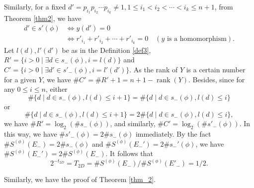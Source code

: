 \documentclass{amsart}
\numberwithin{equation}{section}
\theoremstyle{plain}
\theoremstyle{definition}
\DeclareMathOperator{\rank}{rank}
\begin{document}
{Similarly, for a fixed $d' = p_{i_1}p_{i_2}\cdots p_{i_k} \neq 1, 1\le i_1 < i_2 < \cdots < i_k \le n+1$,  from Theorem \ref{thm2}, we have
$$
	\begin{aligned}
	d' \in s'(\phi) &\Leftrightarrow y(d') = 0 \\
					 &\Leftrightarrow r'_{i_1}+r'_{i_2}+\cdots +r'_{i_k}=0 \quad (y \text{ is a homomorphism}).
	\end{aligned}
$$
 Let $l(d), l'(d')$ be as in the Definition \ref{def3}, $R' = \{i>0 \mid \exists d \in s_-(\phi) , i = l(d) \}$ and $C' = \{i>0 \mid \exists d' \in s'_-(\phi) , i = l'(d') \}$.
 As the rank of $Y$ is a certain number for a given $Y$, we have $\# C' = \# R' + 1 = n+1-\rank(Y)$. Besides, since for any $ 0 \le i \le n$, either
 $$\#\{ d \mid d \in s_-(\phi) ,  l(d) \le i + 1\} = \#\{ d \mid d \in s_-(\phi) , l(d) \le i \}  $$ or
$$\#\{ d \mid d \in s_-(\phi) , l(d) \le i+1 \} = 2 \#\{ d \mid d \in s_-(\phi) , l(d) \le i\} , $$
we have $\# R' = \log_{2}(\# s_-(\phi))$, and similarly, $\# C' = \log_{2}(\# s'_-(\phi))$. In this way, we have  $\# s'_-(\phi) = 2\# s_-(\phi)$ immediately. By the fact $\#  S^{(\phi)}(E_-) = 2 \# s_-(\phi)$ and $\# S^{({\phi})}({E_-'}) = 2 \# s_-'(\phi)$, we have $\# S^{({\phi})}({E_-'}) = 2 \#  S^{(\phi)}(E_-)$. It follows that 
$$2^{-t_{2D}} = T_{2D} = \# S^{(\phi)}(E_-)/\# S^{(\phi)}(E'_{-}) = 1/2.$$
}

Similarly, we have the proof of Theorem \ref{thm_2}.
\end{document}
